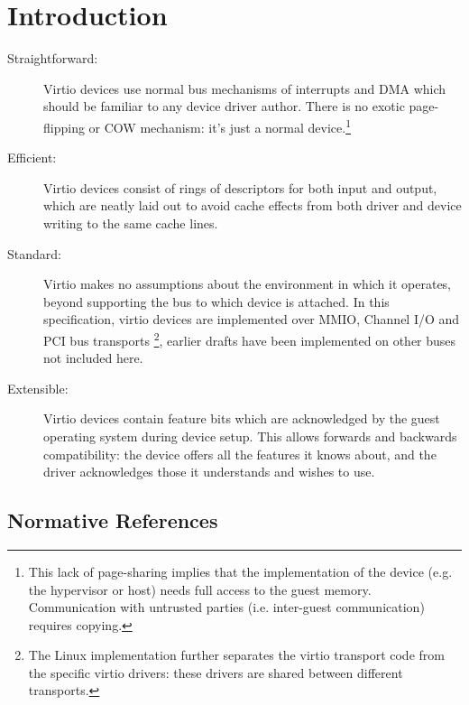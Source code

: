 \chapter{Introduction}



\begin{description}
\item[Straightforward:] Virtio devices use normal bus mechanisms of
  interrupts and DMA which should be familiar to any device driver
  author. There is no exotic page-flipping or COW mechanism: it's just
  a normal device.\footnote{This lack of page-sharing implies that the implementation of the
device (e.g. the hypervisor or host) needs full access to the
guest memory. Communication with untrusted parties (i.e.
inter-guest communication) requires copying.
}

\item[Efficient:] Virtio devices consist of rings of descriptors
  for both input and output, which are neatly laid out to avoid cache
  effects from both driver and device writing to the same cache
  lines.

\item[Standard:] Virtio makes no assumptions about the environment in which
  it operates, beyond supporting the bus to which device is attached.
  In this specification, virtio
  devices are implemented over MMIO, Channel I/O and PCI bus transports
\footnote{The Linux implementation further separates the virtio
transport code from the specific virtio drivers: these drivers are shared
between different transports.
}, earlier drafts
  have been implemented on other buses not included here.

\item[Extensible:] Virtio devices contain feature bits which are
  acknowledged by the guest operating system during device setup.
  This allows forwards and backwards compatibility: the device
  offers all the features it knows about, and the driver
  acknowledges those it understands and wishes to use.
\end{description}

\section{Normative References}

